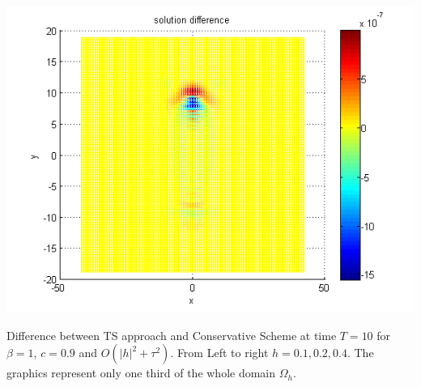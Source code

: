 \documentclass{beamer}
\begin{document}
\begin{frame}
\begin{center}
\begin{minipage}[b]{0.32\linewidth}
		 \includegraphics[width=\linewidth]{figures/compare_128_bt1_c09_h040.png}
	\end{minipage}
\end{center}
Difference between TS approach and Conservative Scheme at time $T=10$  for $\beta=1$, $c = 0.9$  and $O(|h|^2 + \tau^2)$. From Left to right $h=0.1, 0.2, 0.4$. The graphics represent only one third of the whole domain $\Omega_h$.
\end{frame}

\end{document}
